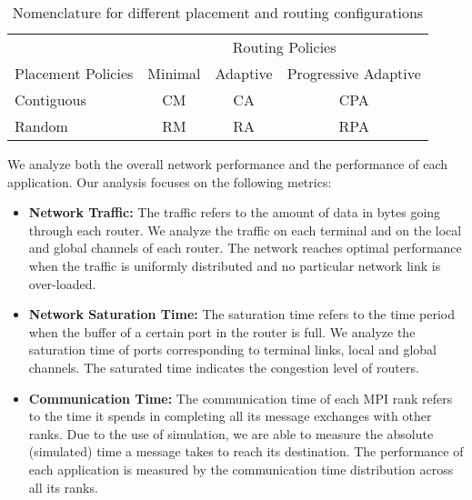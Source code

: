 \begin{table}[ht]
\begin{center}
\caption{Nomenclature for different placement and routing configurations} 
\label{tab: placement routing configs}
\begin{tabular}{l c c c }
\toprule %
\toprule
&\multicolumn{3}{c}{Routing Policies} \\ 
\cmidrule(l){2-4}
Placement Policies & Minimal & Adaptive & Progressive Adaptive\\ %
\midrule %
Contiguous  &  CM   &   CA   &  CPA   \\ %
\midrule
Random  &   RM  &   RA   &  RPA   \\ 
\midrule %
\bottomrule %
\end{tabular}
\end{center}
\end{table}


We analyze both the overall network performance and the performance of each application.
Our analysis focuses on the following metrics:
\begin{itemize}

    \item \textbf{Network Traffic:} The traffic refers to the amount of data in bytes going through each router. We analyze the traffic on each terminal and on the local and global channels of each router. The network reaches optimal performance when the traffic is uniformly distributed and no particular network link is over-loaded. 
            
    \item \textbf{Network Saturation Time:} The saturation time refers to the time period when the buffer of a certain port in the router is full. We analyze the saturation time of ports corresponding to terminal links, local and global channels. The saturated time indicates the congestion level of routers. 
    
    \item \textbf{Communication Time:} The communication time of each MPI rank refers to the time it spends in completing all its message exchanges with other ranks. Due to the use of simulation, we are able to measure the absolute (simulated) time a message takes to reach its destination. The performance of each application is measured by the communication time distribution across all its ranks.    
    
    \end{itemize}

